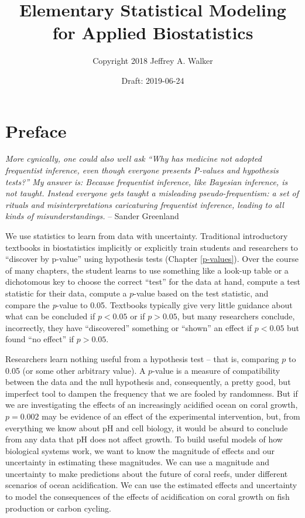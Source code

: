 \documentclass[]{book}
\title{Elementary Statistical Modeling for Applied Biostatistics}
\author{Copyright 2018 Jeffrey A. Walker}
\date{Draft: 2019-06-24}
\begin{document}
\maketitle

{
\setcounter{tocdepth}{1}
\tableofcontents
}
\chapter*{Preface}\label{preface}

\emph{More cynically, one could also well ask ``Why has medicine not
adopted frequentist inference, even though everyone presents P-values
and hypothesis tests?'' My answer is: Because frequentist inference,
like Bayesian inference, is not taught. Instead everyone gets taught a
misleading pseudo-frequentism: a set of rituals and misinterpretations
caricaturing frequentist inference, leading to all kinds of
misunderstandings.} -- Sander Greenland

We use statistics to learn from data with uncertainty. Traditional
introductory textbooks in biostatistics implicitly or explicitly train
students and researchers to ``discover by p-value'' using hypothesis
tests (Chapter \ref{p-values}). Over the course of many chapters, the
student learns to use something like a look-up table or a dichotomous
key to choose the correct ``test'' for the data at hand, compute a test
statistic for their data, compute a \(p\)-value based on the test
statistic, and compare the \emph{p}-value to 0.05. Textbooks typically
give very little guidance about what can be concluded if \(p < 0.05\) or
if \(p > 0.05\), but many researchers conclude, incorrectly, they have
``discovered'' something or ``shown'' an effect if \(p < 0.05\) but
found ``no effect'' if \(p > 0.05\).

Researchers learn nothing useful from a hypothesis test -- that is,
comparing \(p\) to 0.05 (or some other arbitrary value). A \(p\)-value
is a measure of compatibility between the data and the null hypothesis
and, consequently, a pretty good, but imperfect tool to dampen the
frequency that we are fooled by randomness. But if we are investigating
the effects of an increasingly acidified ocean on coral growth,
\(p=0.002\) may be evidence of an effect of the experimental
intervention, but, from everything we know about pH and cell biology, it
would be absurd to conclude from any data that pH does not affect
growth. To build useful models of how biological systems work, we want
to know the magnitude of effects and our uncertainty in estimating these
magnitudes. We can use a magnitude and uncertainty to make predictions
about the future of coral reefs, under different scenarios of ocean
acidification. We can use the estimated effects and uncertainty to model
the consequences of the effects of acidification on coral growth on fish
production or carbon cycling.
\end{document}
